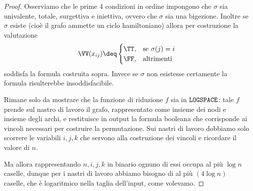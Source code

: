 \begin{proof}
  Osserviamo che le prime 4 condizioni in ordine impongono che $\sigma$ sia 
  univalente, totale, surgettiva e iniettiva, ovvero che $\sigma$ sia una
  bigezione. Inoltre se $\sigma$ esiste (cioè il grafo ammette un ciclo
  hamiltoniano) allora per costruzione la valutazione \[
      \VV(x_{ij}) \deq \begin{cases}
        \TT, &\text{se } \sigma(j) = i\\
        \FF, &\text{altrimenti}
      \end{cases}
  \] soddisfa la formula costruita sopra. Invece se $\sigma$ non esistesse
  certamente la formula risulterebbe insoddisfacibile.

  Rimane solo da mostrare che la funzione di riduzione $f$ sia in $\texttt{LOGSPACE}$:
  tale $f$ prende sul nastro di lavoro il grafo, rappresentato come insieme dei
  nodi e insieme degli archi, e restituisce in output la formula booleana
  che corrisponde ai vincoli necessari per costruire la permutazione.
  Sui nastri di lavoro dobbiamo solo scorrere le variabili $i, j, k$ che
  servono alla costruzione dei vincoli e ricordare il valore di $n$.
  
  Ma allora rappresentando $n, i, j, k$ in binario ognuno di essi occupa al più 
  $\log n$ caselle, dunque per i nastri di lavoro abbiamo bisogno di al più
  $(4\log n)$ caselle, che è logaritmico nella taglia dell'input, come volevamo.
\end{proof}